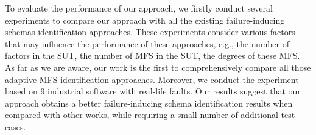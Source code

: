 

To evaluate the performance of our approach, we firstly conduct several experiments to compare our approach with all the existing failure-inducing schemas identification approaches. These experiments consider various factors that may influence the performance of these approaches, e.g., the number of factors in the SUT, the number of MFS in the SUT, the degrees of these MFS. As far as we are aware, our work is the first to comprehensively compare all those adaptive MFS identification approaches. Moreover, we conduct the experiment based on 9 industrial software with real-life faults. Our results suggest that our approach obtains a better failure-inducing schema identification results when compared with other works, while requiring a small number of additional test cases.

